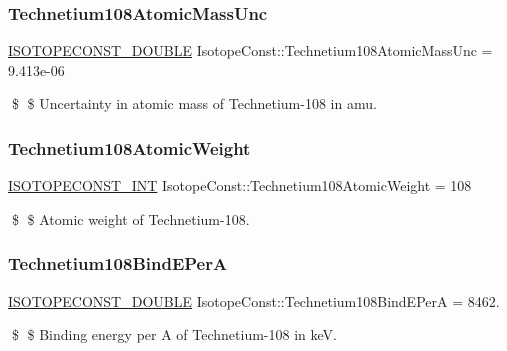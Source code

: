 \subsubsection{\texorpdfstring{Technetium108\+Atomic\+Mass\+Unc}{Technetium108AtomicMassUnc}}
{\footnotesize\ttfamily \mbox{\hyperlink{group___isotope_const-_macros_ga8f45a7272ce02c0b4c65c44636ed719a}{I\+S\+O\+T\+O\+P\+E\+C\+O\+N\+S\+T\+\_\+\+D\+O\+U\+B\+LE}} Isotope\+Const\+::\+Technetium108\+Atomic\+Mass\+Unc = 9.\+413e-\/06}

\$ \$ Uncertainty in atomic mass of Technetium-\/108 in amu. \mbox{\label{group___isotope_const-_technetium-_tc108_gada872d09f61877f608634ae15f26a0f4}} 
\subsubsection{\texorpdfstring{Technetium108\+Atomic\+Weight}{Technetium108AtomicWeight}}
{\footnotesize\ttfamily \mbox{\hyperlink{group___isotope_const-_macros_ga5f18360b3e99483a35c32d789e62621c}{I\+S\+O\+T\+O\+P\+E\+C\+O\+N\+S\+T\+\_\+\+I\+NT}} Isotope\+Const\+::\+Technetium108\+Atomic\+Weight = 108}

\$ \$ Atomic weight of Technetium-\/108. \mbox{\label{group___isotope_const-_technetium-_tc108_gacbf363fb3d0fd15dfcf3600ff945b563}} 
\subsubsection{\texorpdfstring{Technetium108\+Bind\+E\+PerA}{Technetium108BindEPerA}}
{\footnotesize\ttfamily \mbox{\hyperlink{group___isotope_const-_macros_ga8f45a7272ce02c0b4c65c44636ed719a}{I\+S\+O\+T\+O\+P\+E\+C\+O\+N\+S\+T\+\_\+\+D\+O\+U\+B\+LE}} Isotope\+Const\+::\+Technetium108\+Bind\+E\+PerA = 8462.}

\$ \$ Binding energy per A of Technetium-\/108 in keV. \mbox{\label{group___isotope_const-_technetium-_tc108_ga20fc208932e7bf6c18698190a980150d}} 
